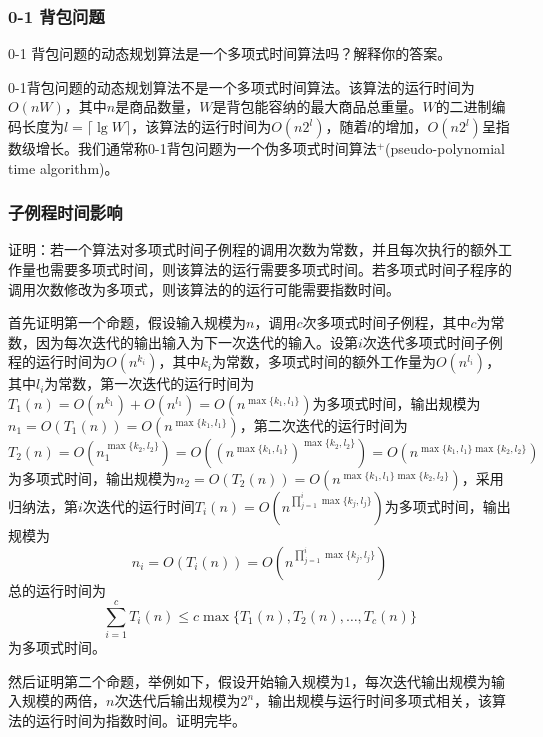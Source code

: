 \documentclass[./../main.tex]{subfiles}
\begin{document}
\subsubsection{0-1 背包问题}
0-1 背包问题的动态规划算法是一个多项式时间算法吗？解释你的答案。

0-1背包问题的动态规划算法不是一个多项式时间算法。该算法的运行时间为$O(nW)$，其中$n$是商品数量，$W$是背包能容纳的最大商品总重量。$W$的二进制编码长度为$l=\lceil \lg W \rceil$，该算法的运行时间为$O(n2^{l})$，随着$l$的增加，$O(n2^{l})$呈指数级增长。我们通常称0-1背包问题为一个伪多项式时间算法$^{+}$(pseudo-polynomial time algorithm)。


\subsubsection{子例程时间影响}
证明：若一个算法对多项式时间子例程的调用次数为常数，并且每次执行的额外工作量也需要多项式时间，则该算法的运行需要多项式时间。若多项式时间子程序的调用次数修改为多项式，则该算法的的运行可能需要指数时间。

首先证明第一个命题，假设输入规模为$n$，调用$c$次多项式时间子例程，其中$c$为常数，因为每次迭代的输出输入为下一次迭代的输入。设第$i$次迭代多项式时间子例程的运行时间为$O(n^{k_{i}})$，其中$k_{i}$为常数，多项式时间的额外工作量为$O(n^{l_{i}})$，其中$l_{i}$为常数，第一次迭代的运行时间为$T_{1}(n)=O(n^{k_{1}})+O(n^{l_{1}})=O(n^{\max\{k_{1},l_{1}\}})$为多项式时间，输出规模为$n_{1}=O(T_{1}(n))=O(n^{\max\{k_{1},l_{1}\}})$，第二次迭代的运行时间为
$$T_{2}(n)=O(n_{1}^{\max\{k_{2}, l_{2}\}})=O((n^{\max\{k_{1}, l_{1}\}})^{\max\{k_{2}, l_{2}\}})=O(n^{\max\{k_{1}, l_{1}\} \max \{k_{2}, l_{2}\}})$$
为多项式时间，输出规模为$n_{2}=O(T_{2}(n))=O(n^{\max\{k_{1}, l_{1}\} \max \{k_{2}, l_{2}\}})$，采用归纳法，第$i$次迭代的运行时间$T_{i}(n)=O(n^{\prod_{j=1}^{i} \max \{k_{j}, l_{j}\}})$为多项式时间，输出规模为
$$n_{i}=O(T_{i}(n))=O(n^{\prod_{j=1}^{i} \max \{k_{j}, l_{j}\}})$$
总的运行时间为
$$\sum_{i=1}^{c} T_{i}(n) \leq c \max \{T_{1}(n), T_{2}(n), \ldots, T_{c}(n)\}$$
为多项式时间。

然后证明第二个命题，举例如下，假设开始输入规模为1，每次迭代输出规模为输入规模的两倍，$n$次迭代后输出规模为$2^{n}$，输出规模与运行时间多项式相关，该算法的运行时间为指数时间。证明完毕。
\end{document}
